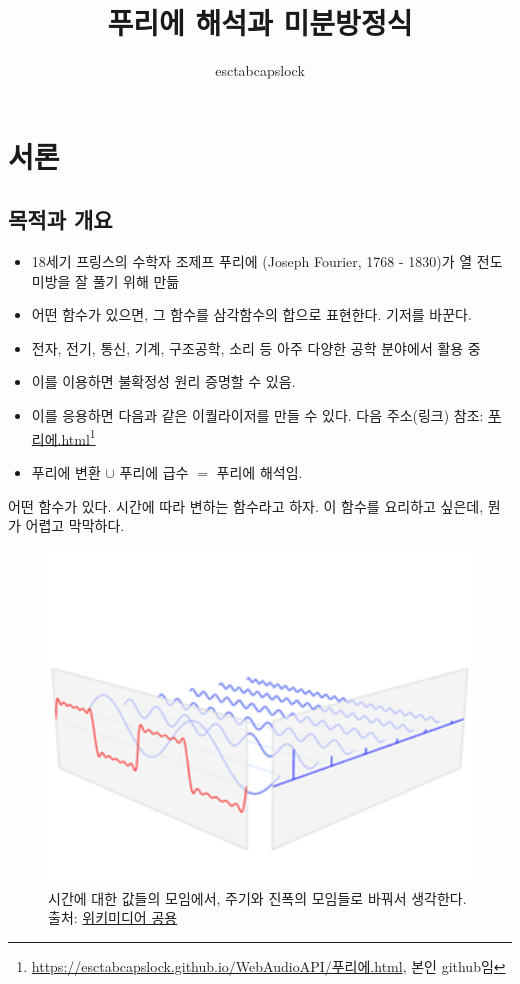 \documentclass[article, oneside]{oblivoir}
\title{푸리에 해석과 미분방정식}
\author{esctabcapslock}
\begin{document}
\maketitle

\section{서론}
\subsection{목적과 개요}

\begin{itemize}
    \item 18세기 프링스의 수학자 조제프 푸리에 (Joseph Fourier, 1768 - 1830)가 열 전도 미방을  잘 풀기 위해 만듦
    \item 어떤 함수가 있으면, 그 함수를 삼각함수의 합으로 표현한다. 기저를 바꾼다.
    \item 전자, 전기, 통신, 기계, 구조공학, 소리 등 아주 다양한 공학 분야에서 활용 중
    \item 이를 이용하면 불확정성 원리 증명할 수 있음.
    \item 이를 응용하면 다음과 같은 이퀄라이저를 만들 수 있다. 다음 주소(링크) 참조: \href{https://esctabcapslock.github.io/WebAudioAPI/푸리에.html}{푸리에.html}\footnote{\href{https://esctabcapslock.github.io/WebAudioAPI/푸리에.html}{https://esctabcapslock.github.io/WebAudioAPI/푸리에.html}, 본인 github임}
    \item 푸리에 변환 $\cup$ 푸리에 급수 $=$ 푸리에 해석임.
\end{itemize}
어떤 함수가 있다. 시간에 따라 변하는 함수라고 하자. 이 함수를 요리하고 싶은데, 뭔가 어렵고 막막하다.

\begin{figure}[ht]
    \centering
    \includegraphics[width=.4\textwidth]{./img/3.png}
    \caption{시간에 대한 값들의 모임에서, 주기와 진폭의 모임들로 바꿔서 생각한다. 출처: \href{https://en.wikipedia.org/wiki/File:Fourier_transform_time_and_frequency_domains_(small).gif}{위키미디어 공용}}
    \label{fig:my_label}
\end{figure}
\end{document}

